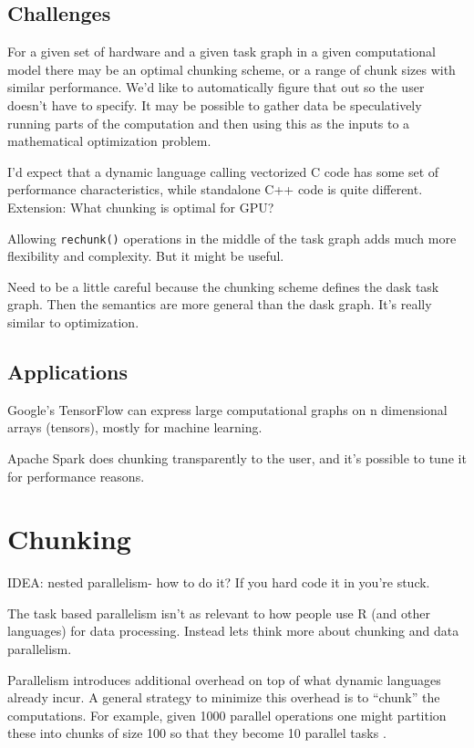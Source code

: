 \documentclass[12pt]{article}
\begin{document}
\subsection{Challenges}

For a given set of hardware and a given task graph in a given
computational model there may be
an optimal chunking scheme, or a range of chunk sizes with similar performance.
We'd like to automatically figure that out so the user doesn't have to
specify. It may be possible to gather data be speculatively running parts
of the computation and then using this as the inputs to a 
mathematical optimization problem.

I'd expect that a dynamic language calling vectorized C code has some set
of performance characteristics, while standalone C++ code is quite
different.
Extension: What chunking is optimal for GPU?

Allowing \texttt{rechunk()} operations in the middle of the task graph adds
much more flexibility and complexity. But it might be useful.

Need to be a little careful because the chunking scheme defines the dask
task graph. Then the semantics are more general than the dask graph. It's
really similar to optimization.

\subsection{Applications}

Google's TensorFlow can express large computational graphs on n dimensional
arrays (tensors), mostly for machine learning.

Apache Spark does chunking transparently to the user, and it's possible to
tune it for performance reasons.




\section{Chunking}

IDEA: nested parallelism- how to do it? If you hard code it in you're
stuck.

The task based parallelism isn't as relevant to how people use R (and other
languages) for data processing. Instead
lets think more about chunking and data parallelism. 

Parallelism introduces additional overhead on top of what dynamic languages
already incur. A general strategy to minimize this overhead is to ``chunk''
the computations. For example, given 1000 parallel operations one might
partition these into chunks of size 100 so that they become 10 parallel
tasks \cite{matloff2015parallel}.
\end{document}
